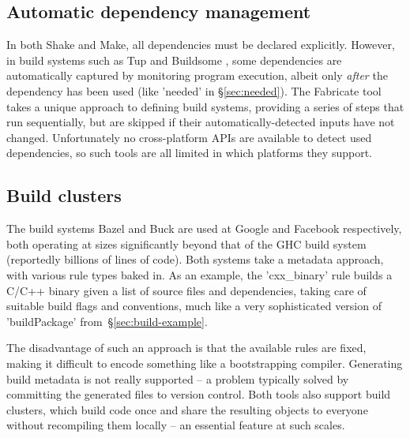 \subsection{Automatic dependency management}

In both Shake and Make, all dependencies must be declared explicitly. However,
in build systems such as Tup \cite{tup} and Buildsome \cite{buildsome}, some
dependencies are automatically captured by monitoring program execution, albeit
only \emph{after} the dependency has been used (like \lst'needed' in
\S\ref{sec:needed}). The Fabricate tool \cite{fabricate} takes a unique approach
to defining build systems, providing a series of steps that run sequentially,
but are skipped if their automatically-detected inputs have not changed.
Unfortunately no cross-platform APIs are available to detect used dependencies,
so such tools are all limited in which platforms they support.

\subsection{Build clusters}

The build systems Bazel and Buck \cite{buck} are used at Google and Facebook
respectively, both operating at sizes significantly beyond that of the GHC build
system (reportedly billions of lines of code). Both systems take a metadata
approach, with various rule types baked in. As an example, the \lst'cxx_binary'
rule builds a C/C++ binary given a list of source files and dependencies,
taking care of suitable build flags and conventions, much like a very sophisticated
version of \lst'buildPackage' from~\S\ref{sec:build-example}.

The disadvantage of such an approach is that the available rules are fixed,
making it difficult to encode something like a bootstrapping compiler.
Generating build metadata is not really supported -- a problem typically solved by
committing the generated files to version control. Both tools also support build
clusters, which build code once and share the resulting objects to everyone
without recompiling them locally -- an essential feature at such scales.
